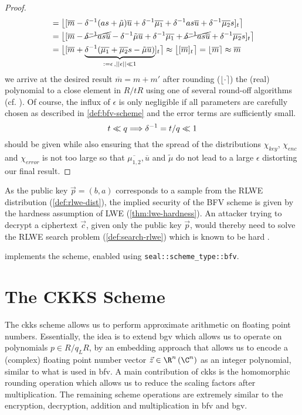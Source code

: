 \begin{proof}
\begin{align*}
     & = \big\lfloor [\overline{m} - \delta^{-1} (as + \tilde{\mu}) \overline{u} + \delta^{-1} \overline{\mu_1} + \delta^{-1} a s \overline{u} + \delta^{-1} \overline{\mu_2} s]_t \big\rceil                                        \\
     & = \big\lfloor [\overline{m} - \cancel{\delta^{-1} as \overline{u}} - \delta^{-1} \tilde{\mu} \overline{u} + \delta^{-1} \overline{\mu_1} + \cancel{\delta^{-1} as \overline{u}} + \delta^{-1} \overline{\mu_2} s]_t \big\rceil \\
     & = \big\lfloor [\overline{m} + \underbrace{\delta^{-1} (\overline{\mu_1} + \overline{\mu_2} s - \tilde{\mu} \overline{u})}_{:= \epsilon \,, ||\epsilon|| \ll 1}]_t \big\rceil
    \approx \big\lfloor [\overline{m}]_t \big\rceil = \lfloor \overline{m} \rceil \approx \overline{m}
  \end{align*}
  we arrive at the desired result $\overline{m} = m + m'$ after rounding ($\lfloor \cdot \rceil$) the (real) polynomial to a close element in $R/tR$ using one of several round-off algorithms  (cf. \cite{2013-rlwe-toolkit}).
  Of course, the influx of $\epsilon$ is only negligible if all parameters are carefully chosen as described in \cref{def:bfv-scheme} and the error terms are sufficiently small.
  $$t \ll q \Longrightarrow \delta^{-1} = t/q \ll 1$$ should be given while also ensuring that the spread of the distributions $\chi_{key}$, $\chi_{enc}$ and $\chi_{error}$ is not too large so that $\overline{\mu_{1,2}}, \overline{u}$ and $\tilde{\mu}$ do not lead to a large $\epsilon$ distorting our final result.
\end{proof}

As the public key $\vec{p} = (b, a)$ corresponds to a sample from the RLWE distribution (\cref{def:rlwe-dist}), the implied security of the BFV scheme is given by the hardness assumption of LWE (\cref{thm:lwe-hardness}).
An attacker trying to decrypt a ciphertext $\vec{c}$, given only the public key $\vec{p}$, would thereby need to solve the RLWE search problem (\cref{def:search-rlwe}) which is known to be hard \parencite{2010-rlwe-original}.

\cite{seal-4.0} implements the scheme, enabled using \texttt{seal::scheme\_type::bfv}.

\pagebreak
\section{The CKKS Scheme}
\label{sec:ckks}
The \gls{ckks} scheme allows us to perform approximate arithmetic on floating point numbers.
Essentially, the idea is to extend \gls{bgv} which allows us to operate on polynomials $p \in R/q_L R$, by an embedding approach that allows us to encode a (complex) floating point number vector $\vec{z} \in \R^n\, (\C^n)$ as an integer polynomial, similar to what is used in \gls{bfv}.
A main contribution of \gls{ckks} is the homomorphic rounding operation which allows us to reduce the scaling factors after multiplication.
The remaining scheme operations are extremely similar to the encryption, decryption, addition and multiplication in \gls{bfv} and \gls{bgv}.

